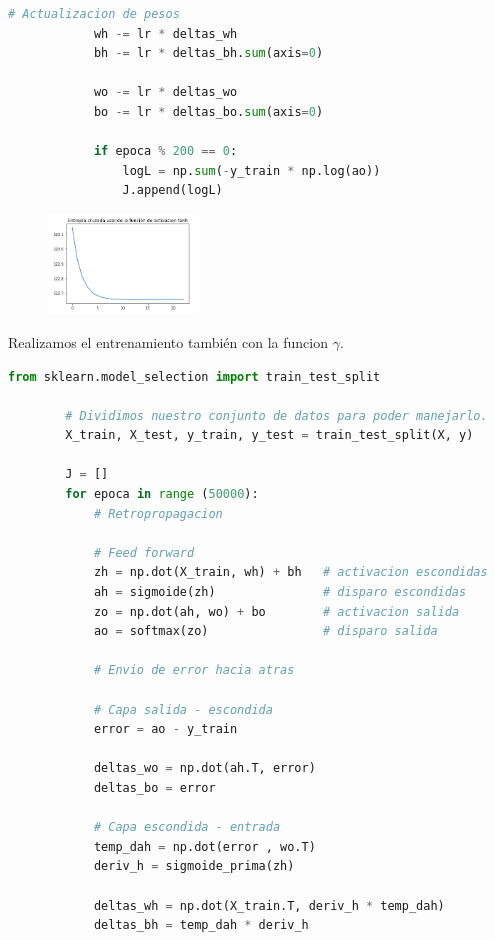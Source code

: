 \documentclass[letterpaper,11pt]{article}
\begin{document}
\begin{enumerate}
\begin{enumerate}
\begin{lstlisting}[language=Python]
            # Actualizacion de pesos
            wh -= lr * deltas_wh
            bh -= lr * deltas_bh.sum(axis=0)

            wo -= lr * deltas_wo
            bo -= lr * deltas_bo.sum(axis=0)
            
            if epoca % 200 == 0:
                logL = np.sum(-y_train * np.log(ao))
                J.append(logL)
        \end{lstlisting}

        \begin{figure}[ht]
            \centering
            \includegraphics[width=0.35\textwidth]{./imagenes/logL-tan.png}
        \end{figure}

        Realizamos el entrenamiento también con la funcion $\gamma$.
        \begin{lstlisting}[language=Python]
        from sklearn.model_selection import train_test_split

        # Dividimos nuestro conjunto de datos para poder manejarlo.
        X_train, X_test, y_train, y_test = train_test_split(X, y)

        J = []
        for epoca in range (50000):
            # Retropropagacion
            
            # Feed forward
            zh = np.dot(X_train, wh) + bh   # activacion escondidas
            ah = sigmoide(zh)               # disparo escondidas
            zo = np.dot(ah, wo) + bo        # activacion salida 
            ao = softmax(zo)                # disparo salida
            
            # Envio de error hacia atras
            
            # Capa salida - escondida  
            error = ao - y_train

            deltas_wo = np.dot(ah.T, error)
            deltas_bo = error

            # Capa escondida - entrada
            temp_dah = np.dot(error , wo.T)
            deriv_h = sigmoide_prima(zh)

            deltas_wh = np.dot(X_train.T, deriv_h * temp_dah)
            deltas_bh = temp_dah * deriv_h


\end{lstlisting}
\end{enumerate}
\end{enumerate}
\end{document}
